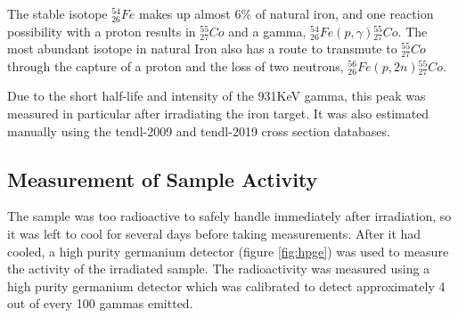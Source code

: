 \FloatBarrier

The stable isotope ${}^{54}_{26} Fe$  makes up almost 6\% of natural iron, and one reaction possibility with a proton results in ${}^{55}_{27} Co$ and a gamma, ${}^{54}_{26} Fe (p, \gamma) {}^{55}_{27} Co$.  The most abundant isotope in natural Iron also has a route to transmute to ${}^{55}_{27} Co$ through the capture of a proton and the loss of two neutrons, ${}^{56}_{26} Fe (p, 2n) {}^{55}_{27} Co$.

Due to the short half-life and intensity of the 931KeV gamma, this peak was measured in particular after irradiating the iron target.  It was also estimated manually using the \acrshort{tendl}-2009 and \acrshort{tendl}-2019 cross section databases.




\subsection{Measurement of Sample Activity}

The sample was too radioactive to safely handle immediately after irradiation, so it was left to cool for several days before taking measurements.  After it had cooled, a high purity germanium detector (figure \ref{fig:hpge}) was used to measure the activity of the irradiated sample.  The radioactivity was measured using a high purity germanium detector which was calibrated to detect approximately 4 out of every 100 gammas emitted.  

